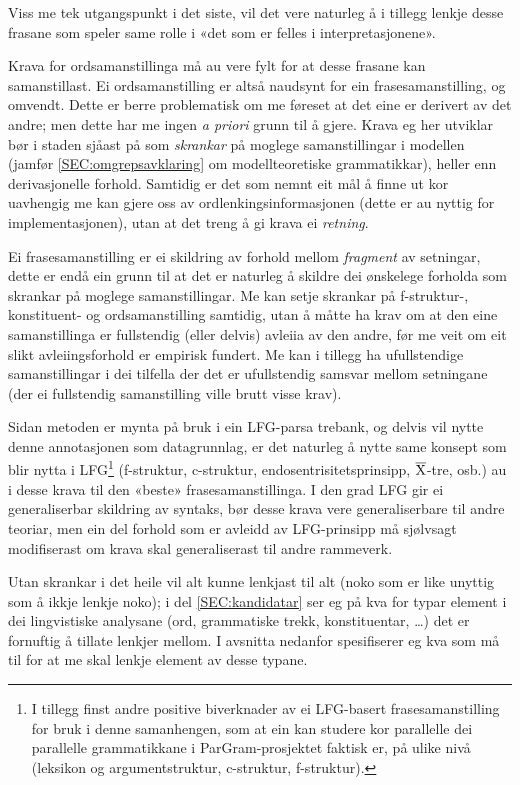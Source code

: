 \documentclass[12pt,a4paper,oneside,draft]{report}
\newcommand{\xbar}{$\rm\overline{X}$}
\begin{document}
Viss me tek utgangspunkt i det siste, vil det vere naturleg å i
tillegg lenkje desse frasane som speler same rolle i «det som er
felles i interpretasjonene».

Krava for ordsamanstillinga må au vere fylt for at desse frasane kan
samanstillast. Ei ordsamanstilling er altså naudsynt for ein
frasesamanstilling, og omvendt. Dette er berre problematisk om me
føreset at det eine er derivert av det andre; men dette har me ingen
\emph{a priori} grunn til å gjere. Krava eg her utviklar bør i staden
sjåast på som \emph{skrankar} på moglege samanstillingar i modellen (jamfør
\ref{SEC:omgrepsavklaring} om modellteoretiske grammatikkar), heller
enn derivasjonelle forhold. Samtidig er det som nemnt eit mål å finne
ut kor uavhengig me kan gjere oss av ordlenkingsinformasjonen (dette
er au nyttig for implementasjonen), utan at det treng å gi krava ei
\emph{retning}.

Ei frasesamanstilling er ei skildring av forhold mellom \emph{fragment} av
setningar, dette er endå ein grunn til at det er naturleg å skildre
dei ønskelege forholda som skrankar på moglege samanstillingar. Me kan
setje skrankar på f\hyp{}struktur-, konstituent- og ordsamanstilling
samtidig, utan å måtte ha krav om at den eine samanstillinga er
fullstendig (eller delvis) avleiia av den andre, før me veit om eit
slikt avleiingsforhold er empirisk fundert. Me kan i tillegg ha
ufullstendige samanstillingar i dei tilfella der det er ufullstendig
samsvar mellom setningane (der ei fullstendig samanstilling ville
brutt visse krav).

Sidan metoden er mynta på bruk i ein LFG-parsa trebank, og delvis vil
 nytte denne annotasjonen som datagrunnlag, er det naturleg å nytte
 same konsept som blir nytta i LFG\footnote{I tillegg finst andre positive biverknader av ei LFG-basert
       frasesamanstilling for bruk i denne samanhengen, som at ein kan
       studere kor parallelle dei parallelle grammatikkane i
       ParGram-prosjektet \citep{butt2002pgp} faktisk er, på ulike
       nivå (leksikon og argumentstruktur, c\hyp{}struktur, f\hyp{}struktur). } (f\hyp{}struktur,
 c\hyp{}struktur, endosentrisitetsprinsipp, \xbar{}-tre, osb.)  au i
 desse krava til den «beste» frasesamanstillinga. I den grad LFG gir
 ei generaliserbar skildring av syntaks, bør desse krava vere
 generaliserbare til andre teoriar, men ein del forhold som er avleidd
 av LFG-prinsipp må sjølvsagt modifiserast om krava skal
 generaliserast til andre rammeverk.

Utan skrankar i det heile vil alt kunne lenkjast til alt (noko som er
 like unyttig som å ikkje lenkje noko); i del \ref{SEC:kandidatar} ser
 eg på kva for typar element i dei lingvistiske analysane (ord,
 grammatiske trekk, konstituentar, \ldots{}) det er fornuftig å tillate
 lenkjer mellom. I avsnitta nedanfor spesifiserer eg kva som må til
 for at me skal lenkje element av desse typane.
\end{document}
